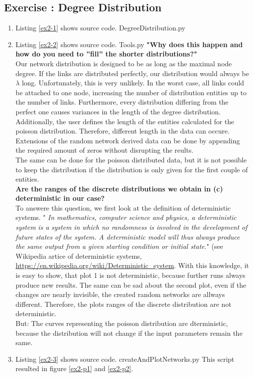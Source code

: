 \documentclass[10pt,a4paper]{article}
\newcommand{\exercise}[1]
{
  \stepcounter{subsection}
  \subsection*{Exercise \thesubsection: #1}

}
\begin{document}
\exercise{Degree Distribution}
\begin{enumerate}
\item Listing \ref{ex2-1} shows source code.
 {DegreeDistribution.py}

\item Listing \ref{ex2-2} shows source code.
 {Tools.py}
\textbf{{"}Why does this happen and how do you need to ”fill” the shorter distributions?{"}}\\
Our network distribution is designed to be as long as the maximal node degree. If the links are distributed perfectly, our distribution would always be $\lambda$ long. Unfortunately, this is very unlikely. In the worst case, all links could be attached to one node, increasing the number of distribution entities up to the number of links. Furthermore, every distribution differing from the perfect one causes variances in the length of the degree distribution.\\
Additionally, the user defines the length of the entities calculated for the poisson distribution. Therefore, different length in the data can occure.\\
Extensions of the random network derived data can be done by appending the required amount of zeros without disrupting the reults.\\
The same can be done for the poisson distributed data, but it is not possible to keep the distribution if the distribution is only given for the first couple of entities.\\
\textbf{Are the ranges of the discrete distributions we obtain in (c) deterministic in our case?}\\
To answere this question, we first look at the definition of deterministic systems. {"}\textit{ In mathematics, computer science and physics, a deterministic system is a system in which no randomness is involved in the development of future states of the system. A deterministic model will thus always produce the same output from a given starting condition or initial state.}{"} (see Wikipedia artice of deterministic systems, \url{https://en.wikipedia.org/wiki/Deterministic_system}. With this knowledge, it is easy to show, that plot 1 is not deterministic, because further runs always produce new results. The same can be sad about the second plot, even if the changes are nearly invisible, the created random networks are allways different. Therefore, the plots ranges of the discrete distribution are not deterministic.\\
But: The curves representing the poisson distribution are dterministic, because the distribution will not change if the input parameters remain the same.
\item Listing \ref{ex2-3} shows source code.
 {createAndPlotNetworks.py}
This script resulted in figure \ref{ex2-p1} and \ref{ex2-p2}.


\end{enumerate}
\end{document}
